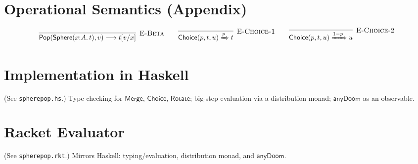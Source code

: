 \documentclass{article}
\newcommand{\Sphere}{\mathsf{Sphere}}
\newcommand{\Pop}{\mathsf{Pop}}
\newcommand{\Merge}{\mathsf{Merge}}
\newcommand{\Choice}{\mathsf{Choice}}
\newcommand{\Rotate}{\mathsf{Rotate}}
\newcommand{\anyDoom}{\mathsf{anyDoom}}
\newcommand{\LongRightarrowp}[1]{\xRightarrow{#1}} %
\newcommand{\longto}{\longrightarrow}
\begin{document}
\section{Operational Semantics (Appendix)}
\[
\infer[\textsc{E-Beta}]{\Pop(\Sphere(x{:}A.\,t), v) \longto t[v/x]}{}
\qquad
\infer[\textsc{E-Choice-1}]{\Choice(p,t,u) \LongRightarrowp{p} t}{}
\qquad
\infer[\textsc{E-Choice-2}]{\Choice(p,t,u) \LongRightarrowp{1-p} u}{}
\]

\section{Implementation in Haskell}
(See \texttt{spherepop.hs}.) Type checking for \(\Merge\), \(\Choice\), \(\Rotate\); big-step evaluation via a distribution monad; \(\anyDoom\) as an observable.

\section{Racket Evaluator}
(See \texttt{spherepop.rkt}.) Mirrors Haskell: typing/evaluation, distribution monad, and \(\anyDoom\).



\end{document}
